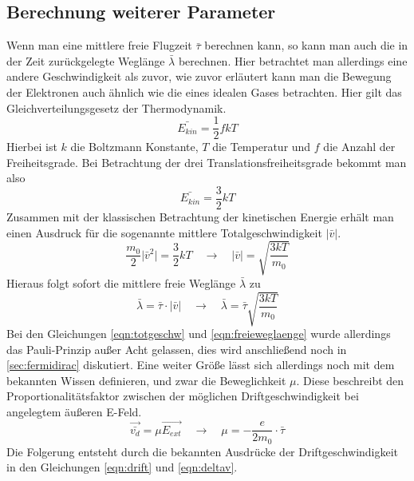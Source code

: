 \subsection{Berechnung weiterer Parameter}
Wenn man eine mittlere freie Flugzeit $\bar{\tau}$ berechnen kann, so kann man auch die in der Zeit zurückgelegte Weglänge $\bar{\lambda}$ berechnen. Hier betrachtet man allerdings
eine andere Geschwindigkeit als zuvor, wie zuvor erläutert kann man die Bewegung der Elektronen auch ähnlich wie die eines idealen Gases betrachten. 
Hier gilt das Gleichverteilungsgesetz der Thermodynamik.
\begin{equation}
\bar{E_{kin}} = \frac{1}{2} f k T
\end{equation}
Hierbei ist $k$ die Boltzmann Konstante, $T$ die Temperatur und $f$ die Anzahl der Freiheitsgrade. Bei Betrachtung der drei Translationsfreiheitsgrade bekommt man also
\begin{equation}
\bar{E_{kin}} = \frac{3}{2} k T
\end{equation}
Zusammen mit der klassischen Betrachtung der kinetischen Energie erhält man einen Ausdruck für die sogenannte mittlere Totalgeschwindigkeit $\lvert \bar{v} \rvert$.
\begin{equation}
\label{eqn:totgeschw}
\frac{m_{0}}{2} \lvert \bar{v}^{2} \rvert = \frac{3}{2} k T \quad \to \quad \lvert \bar{v} \rvert = \sqrt{\frac{3kT}{m_{0}}}
\end{equation}
Hieraus folgt sofort die mittlere freie Weglänge $\bar{\lambda}$ zu
\begin{equation}
\label{eqn:freieweglaenge}
\bar{\lambda} = \bar{\tau} \cdot \lvert \bar{v} \rvert \quad \to \quad \bar{\lambda} = \bar{\tau} \sqrt{\frac{3kT}{m_{0}}}
\end{equation}
Bei den Gleichungen \eqref{eqn:totgeschw} und \eqref{eqn:freieweglaenge} wurde allerdings das Pauli-Prinzip außer Acht gelassen, dies wird anschließend noch in \ref{sec:fermidirac}
diskutiert. Eine weiter Größe lässt sich allerdings noch mit dem bekannten Wissen definieren, und zwar die Beweglichkeit $\mu$. Diese beschreibt den Proportionalitätsfaktor zwischen
der möglichen Driftgeschwindigkeit bei angelegtem äußeren E-Feld.
\begin{equation}
\vec{\bar{v_{d}}} = \mu \vec{E_{ext}} \quad \to \quad \mu = - \frac{e}{2 m_{0}} \cdot \bar{\tau} 
\end{equation}
Die Folgerung entsteht durch die bekannten Ausdrücke der Driftgeschwindigkeit in den Gleichungen \eqref{eqn:drift} und \eqref{eqn:deltav}.

